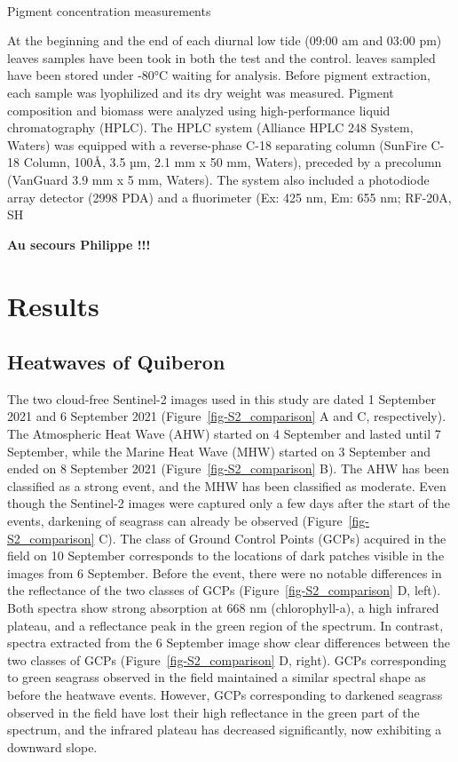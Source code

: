 \documentclass[
  number]{elsarticle}
\makeatletter
\let\oldparagraph\paragraph
\renewcommand{\paragraph}{
    \@ifstar
      \xxxParagraphStar
      \xxxParagraphNoStar
  }
\newcommand{\xxxParagraphStar}[1]{\oldparagraph*{#1}\mbox{}}
\newcommand{\xxxParagraphNoStar}[1]{\oldparagraph{#1}\mbox{}}
\makeatother
\begin{document}
\paragraph{Pigment concentration
measurements}\label{pigment-concentration-measurements}

At the beginning and the end of each diurnal low tide (09:00 am and
03:00 pm) leaves samples have been took in both the test and the
control. leaves sampled have been stored under -80°C waiting for
analysis. Before pigment extraction, each sample was lyophilized and its
dry weight was measured. Pigment composition and biomass were analyzed
using high-performance liquid chromatography (HPLC). The HPLC system
(Alliance HPLC 248 System, Waters) was equipped with a reverse-phase
C-18 separating column (SunFire C-18 Column, 100Å, 3.5 µm, 2.1 mm x 50
mm, Waters), preceded by a precolumn (VanGuard 3.9 mm x 5 mm, Waters).
The system also included a photodiode array detector (2998 PDA) and a
fluorimeter (Ex: 425 nm, Em: 655 nm; RF-20A, SH

\textbf{Au secours Philippe !!!}

\section{Results}\label{results}

\subsection{Heatwaves of Quiberon}\label{heatwaves-of-quiberon}

The two cloud-free Sentinel-2 images used in this study are dated 1
September 2021 and 6 September 2021 (Figure~\ref{fig-S2_comparison} A
and C, respectively). The Atmospheric Heat Wave (AHW) started on 4
September and lasted until 7 September, while the Marine Heat Wave (MHW)
started on 3 September and ended on 8 September 2021
(Figure~\ref{fig-S2_comparison} B). The AHW has been classified as a
strong event, and the MHW has been classified as moderate. Even though
the Sentinel-2 images were captured only a few days after the start of
the events, darkening of seagrass can already be observed
(Figure~\ref{fig-S2_comparison} C). The class of Ground Control Points
(GCPs) acquired in the field on 10 September corresponds to the
locations of dark patches visible in the images from 6 September. Before
the event, there were no notable differences in the reflectance of the
two classes of GCPs (Figure~\ref{fig-S2_comparison} D, left). Both
spectra show strong absorption at 668 nm (chlorophyll-a), a high
infrared plateau, and a reflectance peak in the green region of the
spectrum. In contrast, spectra extracted from the 6 September image show
clear differences between the two classes of GCPs
(Figure~\ref{fig-S2_comparison} D, right). GCPs corresponding to green
seagrass observed in the field maintained a similar spectral shape as
before the heatwave events. However, GCPs corresponding to darkened
seagrass observed in the field have lost their high reflectance in the
green part of the spectrum, and the infrared plateau has decreased
significantly, now exhibiting a downward slope.
\end{document}
